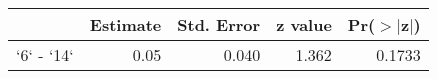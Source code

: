 \begin{table}[ht]
\centering
\begin{tabular}{rrrrr}
  \hline
 & Estimate & Std. Error & z value & Pr($>$$|$z$|$) \\ 
  \hline
`6` - `14` & 0.05 & 0.040 & 1.362 & 0.1733 \\ 
   \hline
\end{tabular}
\end{table}
